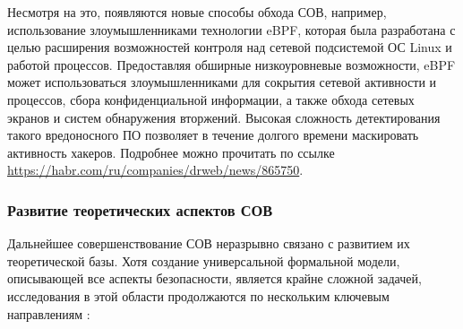 Несмотря на это, появляются новые способы обхода СОВ, например, использование злоумышленниками технологии eBPF, которая была разработана с целью расширения возможностей контроля над сетевой подсистемой ОС Linux и работой процессов.
Предоставляя обширные низкоуровневые возможности, eBPF может использоваться злоумышленниками для сокрытия сетевой активности и процессов, сбора конфиденциальной информации, а также обхода сетевых экранов и систем обнаружения вторжений.
Высокая сложность детектирования такого вредоносного ПО позволяет в течение долгого времени маскировать активность хакеров.
Подробнее можно прочитать по ссылке \url{https://habr.com/ru/companies/drweb/news/865750}.

\subsubsection{Развитие теоретических аспектов СОВ}

Дальнейшее совершенствование СОВ неразрывно связано с развитием их теоретической базы. Хотя создание универсальной формальной модели, описывающей все аспекты безопасности, является крайне сложной задачей, исследования в этой области продолжаются по нескольким ключевым направлениям \autocite{IDSBranitsky}:

